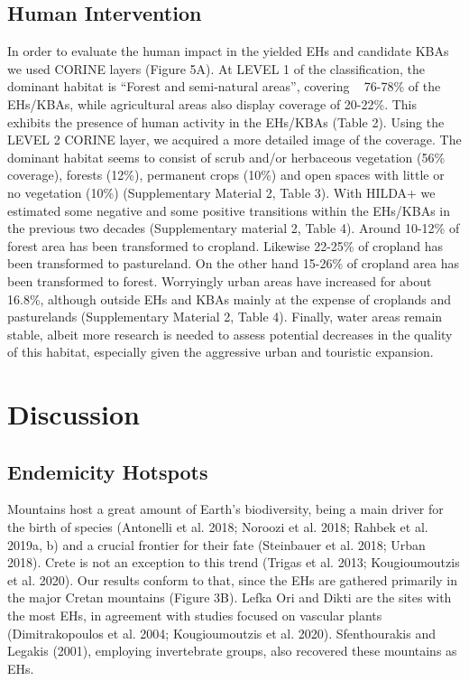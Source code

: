     \subsection{Human Intervention}
    \label{subsec:arthropods-human-intervention}


In order to evaluate the human impact in the yielded EHs and candidate KBAs we
used CORINE layers (Figure 5A). At LEVEL 1 of the classification, the dominant
habitat is “Forest and semi-natural areas”, covering ~ 76-78\% of the EHs/KBAs,
while agricultural areas also display coverage of 20-22\%. This exhibits the
presence of human activity in the EHs/KBAs (Table 2). Using the LEVEL 2 CORINE
layer, we acquired a more detailed image of the coverage. The dominant habitat
seems to consist of scrub and/or herbaceous vegetation  (56\% coverage),
forests (12\%), permanent crops (10\%) and open spaces with little or
no vegetation (10\%) (Supplementary Material 2, Table 3). With HILDA+ we
estimated some negative and some positive transitions within the EHs/KBAs in
the previous two decades (Supplementary material 2, Table 4). Around 10-12\% of
forest area has been transformed to cropland. Likewise 22-25\% of cropland has
been transformed to pastureland. On the other hand 15-26\% of cropland area has
been transformed to forest. Worryingly urban areas have increased for about 16.8\%,
although outside EHs and KBAs mainly at the expense of croplands and
pasturelands (Supplementary Material 2, Table 4). Finally, water areas remain
stable, albeit more research is needed to assess potential decreases in the
quality of this habitat, especially given the aggressive urban and touristic expansion.

\section{Discussion}
\label{sec:arthropods-discussion}

    \subsection{Endemicity Hotspots}
    \label{subsec:arthropods-Endemicity-Hotspots}

Mountains host a great amount of Earth’s biodiversity, being a main driver for
the birth of species (Antonelli et al. 2018; Noroozi et al. 2018; Rahbek et al. 2019a, b)
and a crucial frontier for their fate (Steinbauer et al. 2018; Urban 2018).
Crete is not an exception to this trend (Trigas et al. 2013; Kougioumoutzis et al. 2020).
Our results conform to that, since the EHs are gathered primarily in the major
Cretan mountains (Figure 3B). Lefka Ori and Dikti are the sites with the most
EHs, in agreement with studies focused on vascular plants (Dimitrakopoulos et al. 2004; Kougioumoutzis et al. 2020).
Sfenthourakis and Legakis (2001), employing invertebrate groups, also recovered these mountains as EHs.

